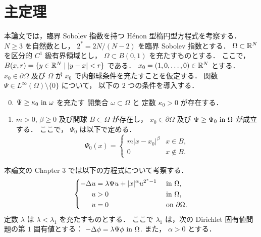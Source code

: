 %
%

\section{主定理}

本論文では，臨界 Sobolev 指数を持つ Hénon 型楕円型方程式を考察する．
$N \geq 3$ を自然数とし， $2^* = 2N/(N-2)$ を臨界 Sobolev 指数とする．
$\Omega \subset \mathbb{R}^N$ を区分的 $C^1$ 級有界領域とし，
$\Omega \subset B(0, 1)$ を充たすものとする．
ここで， $B(x, r) = \{ y \in \mathbb{R}^N \mid \lvert y - x \rvert < r \}$
である．
$x_0 = (1, 0, \dots, 0) \in \mathbb{R}^N$ とする．
$x_0 \in \partial \Omega$ 及び
$\Omega$ が $x_0$ で内部球条件を充たすことを仮定する．
関数 $\Psi \in L^\infty(\Omega) \setminus \{ 0 \}$ について，
以下の $2$ つの条件を導入する．
\begin{enumerate}[(T1)]
  \setcounter{enumi}{-1}
  \item \label{enum:T0}
    $\Psi \geq \kappa_0 \text{ in } \omega$ を充たす
    開集合 $\omega \subset \Omega$ と
    定数 $\kappa_0 > 0$ が存在する．
  \item \label{enum:T1}
    $m > 0$, $\beta \geq 0$ 及び開球
    $B \subset \Omega$ が存在し，
    $x_0 \in \partial \Omega$ 及び
    $\Psi \geq \Psi_0 \text{ in } \Omega$ が成立する．
    ここで， $\Psi_0$ は以下で定める．
    \begin{equation}
      \Psi_0(x) =
      \begin{cases}
        m \left\lvert x - x_0 \right\rvert^\beta
        & x \in B, \\
        0 & x \not\in B.
      \end{cases}
      \label{eq:Psi_0}
    \end{equation}
\end{enumerate}

本論文の Chapter 3 では以下の方程式について考察する．
\begin{align}
  \left\{
  \begin{aligned}
    - \Delta u & = \lambda \Psi u + \lvert x \rvert^\alpha u^{2^*-1}
               &                                                     & \text{ in } \Omega,                        \\
    u          & > 0                                                 &              & \text{ in } \Omega,         \\
    u          & = 0                                                 &              & \text{ on } \partial\Omega.
  \end{aligned}
  \right. \label{eq:henon_prob_main}
\end{align}
定数 $\lambda$ は $\lambda < \lambda_1$ を充たすものとする．
ここで $\lambda_1$ は，次の
Dirichlet 固有値問題の第 $1$ 固有値とする：
$-\Delta \phi = \lambda \Psi \phi \text{ in } \Omega$.
また， $\alpha > 0$ とする．

